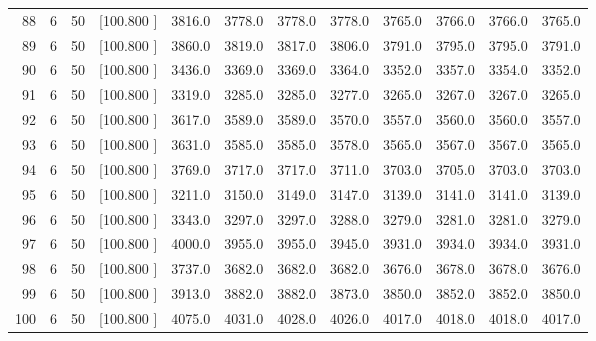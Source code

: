\documentclass[12pt,a4paper]{article}
\begin{document}
\begin{center}
{\begin{tabular}{r r r r r r r r r r r r}
  88&  6& 50&[100.800   ]&  3816.0&  3778.0&  3778.0&  3778.0&  3765.0&  3766.0&  3766.0&  3765.0\\[-0.02in]
  89&  6& 50&[100.800   ]&  3860.0&  3819.0&  3817.0&  3806.0&  3791.0&  3795.0&  3795.0&  3791.0\\[-0.02in]
  90&  6& 50&[100.800   ]&  3436.0&  3369.0&  3369.0&  3364.0&  3352.0&  3357.0&  3354.0&  3352.0\\[-0.02in]
  91&  6& 50&[100.800   ]&  3319.0&  3285.0&  3285.0&  3277.0&  3265.0&  3267.0&  3267.0&  3265.0\\[-0.02in]
  92&  6& 50&[100.800   ]&  3617.0&  3589.0&  3589.0&  3570.0&  3557.0&  3560.0&  3560.0&  3557.0\\[-0.02in]
  93&  6& 50&[100.800   ]&  3631.0&  3585.0&  3585.0&  3578.0&  3565.0&  3567.0&  3567.0&  3565.0\\[-0.02in]
  94&  6& 50&[100.800   ]&  3769.0&  3717.0&  3717.0&  3711.0&  3703.0&  3705.0&  3703.0&  3703.0\\[-0.02in]
  95&  6& 50&[100.800   ]&  3211.0&  3150.0&  3149.0&  3147.0&  3139.0&  3141.0&  3141.0&  3139.0\\[-0.02in]
  96&  6& 50&[100.800   ]&  3343.0&  3297.0&  3297.0&  3288.0&  3279.0&  3281.0&  3281.0&  3279.0\\[-0.02in]
  97&  6& 50&[100.800   ]&  4000.0&  3955.0&  3955.0&  3945.0&  3931.0&  3934.0&  3934.0&  3931.0\\[-0.02in]
  98&  6& 50&[100.800   ]&  3737.0&  3682.0&  3682.0&  3682.0&  3676.0&  3678.0&  3678.0&  3676.0\\[-0.02in]
  99&  6& 50&[100.800   ]&  3913.0&  3882.0&  3882.0&  3873.0&  3850.0&  3852.0&  3852.0&  3850.0\\[-0.02in]
 100&  6& 50&[100.800   ]&  4075.0&  4031.0&  4028.0&  4026.0&  4017.0&  4018.0&  4018.0&  4017.0\\[-0.02in]

\hline
\end{tabular}}
\end{center}
\newpage
\end{document}
